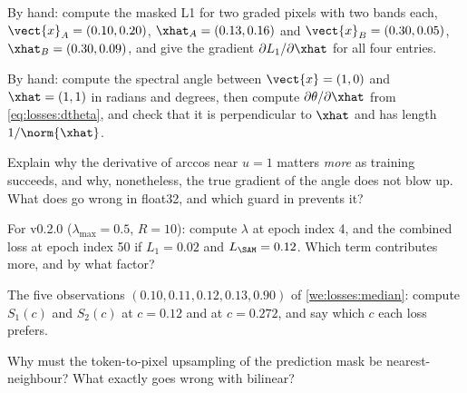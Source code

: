 \begin{checkyourself}
\item\label{ex:losses:1} By hand: compute the masked L1 for two graded pixels with two bands
each, $\vect{x}_A = (0.10, 0.20)$, $\xhat_A = (0.13, 0.16)$ and $\vect{x}_B = (0.30, 0.05)$,
$\xhat_B = (0.30, 0.09)$, and give the gradient $\partial L_1/\partial\xhat$ for all four
entries.
\item\label{ex:losses:2} By hand: compute the spectral angle between $\vect{x} = (1, 0)$ and
$\xhat = (1, 1)$ in radians and degrees, then compute $\partial\theta/\partial\xhat$ from
\cref{eq:losses:dtheta}, and check that it is perpendicular to $\xhat$ and has length
$1/\norm{\xhat}$.
\item\label{ex:losses:3} Explain why the derivative of arccos near $u = 1$ matters
\emph{more} as training succeeds, and why, nonetheless, the true gradient of the angle does not
blow up. What does go wrong in float32, and which guard in  prevents it?
\item\label{ex:losses:4} For v0.2.0 ($\lambda_{\max} = 0.5$, $R = 10$): compute $\lambda$ at
epoch index 4, and the combined loss at epoch index 50 if $L_1 = 0.02$ and $L_{\SAM} = 0.12$.
Which term contributes more, and by what factor?
\item\label{ex:losses:5} The five observations $(0.10, 0.11, 0.12, 0.13, 0.90)$ of
\cref{we:losses:median}: compute $S_1(c)$ and $S_2(c)$ at $c = 0.12$ and at $c = 0.272$, and
say which $c$ each loss prefers.
\item\label{ex:losses:6} Why must the token-to-pixel upsampling of the prediction mask be
nearest-neighbour? What exactly goes wrong with bilinear?
\end{checkyourself}

\par\endgroup
